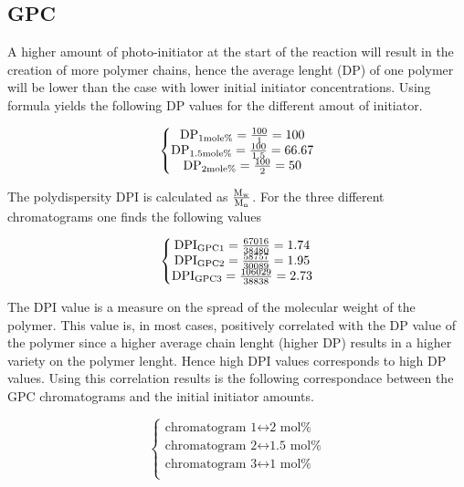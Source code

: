 \subsection{GPC}

    A higher amount of photo-initiator at the start of the reaction will result in 
    the creation of more polymer chains, hence the average lenght (DP) of one polymer 
    will be lower than the case with lower initial initiator concentrations. Using formula 
     yields the following DP values for the different amout of initiator.

    $$\left\{\begin{matrix}
        \mathtext[1mole\%]{DP} = \frac{100}{1} = 100 \\
        \mathtext[1.5mole\%]{DP} = \frac{100}{1.5} = 66.67 \\
        \mathtext[2mole\%]{DP} = \frac{100}{2} = 50 \\
    \end{matrix}\right.$$

    The polydispersity DPI is calculated as $\frac{\mathtext[w]{M}}{\mathtext[n]{M}}$. For the 
    three different chromatograms one finds the following values

    $$\left\{\begin{matrix}
        \mathtext[GPC1]{DPI} = \frac{67016}{38480} = 1.74\\
        \mathtext[GPC2]{DPI} = \frac{58757}{30089} = 1.95\\
        \mathtext[GPC3]{DPI} = \frac{106029}{38838} = 2.73\\
    \end{matrix}\right.$$

    The DPI value is a measure on the spread of the molecular weight of the polymer. This value is, in most cases, 
    positively correlated with the DP value of the polymer since a higher average chain lenght (higher DP) results 
    in a higher variety on the polymer lenght. Hence high DPI values corresponds to high DP values. Using this correlation 
    results is the following correspondace between the GPC chromatograms and the initial initiator amounts.

    $$\left\{\begin{matrix}
        \text{chromatogram 1} \longleftrightarrow \text{2 mol\%}\\
        \text{chromatogram 2} \longleftrightarrow \text{1.5 mol\%}\\
        \text{chromatogram 3} \longleftrightarrow \text{1 mol\%}\\
    \end{matrix}\right.$$